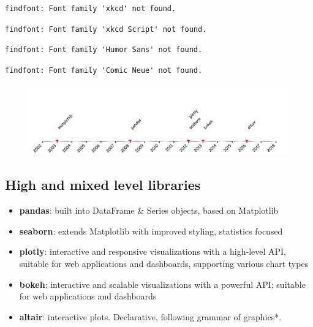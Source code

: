 \documentclass[
  letterpaper,
  DIV=11,
  numbers=noendperiod]{scrartcl}
\providecommand{\tightlist}{%
  \setlength{\itemsep}{0pt}\setlength{\parskip}{0pt}}\usepackage{longtable,booktabs,array}
\begin{document}
\begin{verbatim}
findfont: Font family 'xkcd' not found.
\end{verbatim}

\begin{verbatim}
findfont: Font family 'xkcd Script' not found.
\end{verbatim}

\begin{verbatim}
findfont: Font family 'Humor Sans' not found.
\end{verbatim}

\begin{verbatim}
findfont: Font family 'Comic Neue' not found.
\end{verbatim}

\begin{figure}[H]

{\centering \includegraphics{plotting_libs_eda_files/figure-pdf/cell-3-output-377.pdf}

}

\end{figure}

\hypertarget{high-and-mixed-level-libraries}{%
\subsection{High and mixed level
libraries}\label{high-and-mixed-level-libraries}}

\begin{itemize}
\tightlist
\item
  \textbf{pandas}: built into DataFrame \& Series objects, based on
  Matplotlib
\item
  \textbf{seaborn}: extends Matplotlib with improved styling, statistics
  focused
\item
  \textbf{plotly}: interactive and responsive visualizations with a
  high-level API, suitable for web applications and dashboards,
  supporting various chart types
\item
  \textbf{bokeh}: interactive and scalable visualizations with a
  powerful API; suitable for web applications and dashboards
\item
  \textbf{altair}: interactive plots. Declarative, following grammar of
  graphics*.
\end{itemize}
\end{document}

